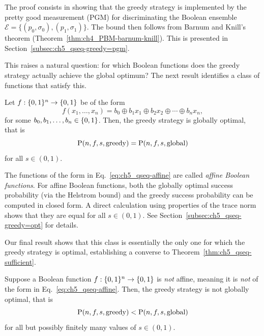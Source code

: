 The proof consists in showing that the greedy strategy is implemented by the pretty good measurement (PGM) \cite{hausladen1994pretty} for discriminating the
Boolean ensemble $\mathcal{E} = \{(p_0, \sigma_0), (p_1, \sigma_1)\}$.
The bound then follows from Barnum and Knill's theorem (Theorem~\ref{thm:ch4_PBM-barnum-knill}).
This is presented in Section~\ref{subsec:ch5_qseq-greedy=pgm}.

This raises a natural question: for which Boolean functions does the greedy strategy actually achieve the global optimum?
The next result identifies a class of functions that satisfy this.
\begin{theorem}[Sufficiency]\label{thm:ch5_qseq-sufficient}
    Let $f : \{ 0, 1 \}^n \to \{ 0, 1 \}$ be of the form
    \begin{equation}\label{eq:ch5_qseq-affine}
        f(x_1,\ldots,x_n) = b_0 \oplus b_1 x_1 \oplus b_2 x_2 \oplus \cdots \oplus b_n x_n,
    \end{equation}
    for some $b_0, b_1, \ldots, b_n \in \{ 0, 1 \}$.
    Then, the greedy strategy is globally optimal, that is
    \begin{equation}
        \operatorname{P}(n,f,s,\mathrm{greedy})=\operatorname{P}(n,f,s,\mathrm{global})
    \end{equation}
    for all $s \in (0,1)$.
\end{theorem}
\theoremstyle{plain}
\newtheorem*{sufficientrestate}{Theorem~\ref{thm:ch5_qseq-sufficient}}

The functions of the form in Eq.~\eqref{eq:ch5_qseq-affine} are called \emph{affine Boolean functions}.
For affine Boolean functions, both the globally optimal success probability (via the Helstrom bound) and the greedy success probability can be computed in closed form.
A direct calculation using properties of the trace norm shows that they are equal for all $s \in (0,1)$.
See Section~\ref{subsec:ch5_qseq-greedy=opt} for details.

Our final result shows that this class is essentially the only one for which the greedy strategy is optimal, establishing a converse to Theorem~\ref{thm:ch5_qseq-sufficient}.

\begin{theorem}[Necessity]\label{thm:ch5_qseq-necessary}
    Suppose a Boolean function $f : \{ 0, 1 \}^n \to \{ 0, 1 \}$ is \emph{not} affine, meaning it is \emph{not} of the form in Eq.~\eqref{eq:ch5_qseq-affine}.
    Then, the greedy strategy is not globally optimal, that is
    \begin{equation}
        \operatorname{P}(n,f,s,\mathrm{greedy}) < \operatorname{P}(n,f,s,\mathrm{global})
    \end{equation}
    for all but possibly finitely many values of $s \in (0,1)$.
\end{theorem}
\theoremstyle{plain}
\newtheorem*{necessaryrestate}{Theorem~\ref{thm:ch5_qseq-necessary}}

